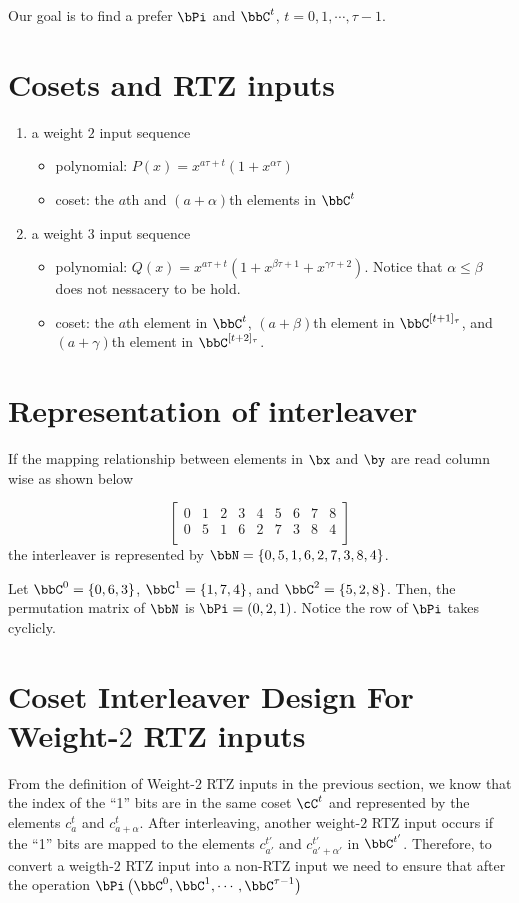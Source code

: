 \documentclass[11pt, oneside, dvipdfmx]{book}
\begin{document}
Our goal is to find a prefer $\bPi$ and $\bbC^t$, $t = 0,1,\cdots,\tau-1$.
\section{Cosets and RTZ inputs}

\begin{enumerate}
\item a weight $2$ input sequence
\begin{itemize}
	\item polynomial: $P(x)=x^{a\tau+t}(1+x^{\alpha \tau})$
	\item coset: the $a$th and $(a+\alpha)$th elements in $\bbC^t$
\end{itemize}
\item a weight $3$ input sequence
\begin{itemize}
	\item polynomial: $Q(x) =x^{a\tau+t}(1+x^{\beta \tau +1}+x^{\gamma \tau +2})$. Notice that $\alpha \leq \beta$ does not nessacery to be hold.
	\item coset: the $a$th element in $\bbC^{t}$, $(a+\beta)$th element in $\bbC^{[t+1]_\tau}$, and $(a+\gamma)$th element in $\bbC^{[t+2]_\tau}$.
\end{itemize}
\end{enumerate}

\section{Representation of interleaver}
If the mapping relationship between elements in $\bx$ and $\by$ are read column wise as shown below

$$  
 \begin{bmatrix}
0 & 1 & 2 & 3 & 4 & 5 & 6 & 7 & 8 \\
0 & 5 & 1 & 6 & 2 & 7 & 3 & 8 & 4 \\
\end{bmatrix}
$$
the interleaver is represented by $\bbN=\{0,5,1,6,2,7,3,8,4\}$.

Let $\bbC^0=\{0,6,3\}$, $\bbC^1=\{1,7,4\}$, and $\bbC^2=\{5,2,8\}$. Then, the permutation matrix of $\bbN$ is
$\bPi = (0,2,1)$. Notice the row of $\bPi$ takes cyclicly.


\section{Coset Interleaver Design For Weight-$2$ RTZ inputs}
From the definition of Weight-$2$ RTZ inputs in the previous section, we know that the index of the ``1'' bits are in the same coset $\cC^t$ and represented by the elements $c_a^t$ and $c_{a+\alpha}^t$. After interleaving, another weight-$2$ RTZ input occurs if the ``1'' bits are mapped to the elements $c_{a'}^{t'}$ and $c_{a'+\alpha'}^{t'}$
 in $\bbC^{t'}$.
Therefore, to convert a weigth-$2$ RTZ input into a non-RTZ input we need to ensure that after the operation $\bPi\left(\bbC^0,\bbC^1,\cdots,\bbC^{\tau-1}\right)$ 
\end{document}
